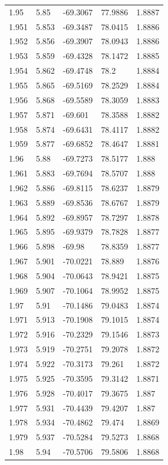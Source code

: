 \begin{tabular}{lllll}
1.95 & 5.85 & -69.3067 & 77.9886 & 1.8887 \\
1.951 & 5.853 & -69.3487 & 78.0415 & 1.8886 \\
1.952 & 5.856 & -69.3907 & 78.0943 & 1.8886 \\
1.953 & 5.859 & -69.4328 & 78.1472 & 1.8885 \\
1.954 & 5.862 & -69.4748 & 78.2 & 1.8884 \\
1.955 & 5.865 & -69.5169 & 78.2529 & 1.8884 \\
1.956 & 5.868 & -69.5589 & 78.3059 & 1.8883 \\
1.957 & 5.871 & -69.601 & 78.3588 & 1.8882 \\
1.958 & 5.874 & -69.6431 & 78.4117 & 1.8882 \\
1.959 & 5.877 & -69.6852 & 78.4647 & 1.8881 \\
1.96 & 5.88 & -69.7273 & 78.5177 & 1.888 \\
1.961 & 5.883 & -69.7694 & 78.5707 & 1.888 \\
1.962 & 5.886 & -69.8115 & 78.6237 & 1.8879 \\
1.963 & 5.889 & -69.8536 & 78.6767 & 1.8879 \\
1.964 & 5.892 & -69.8957 & 78.7297 & 1.8878 \\
1.965 & 5.895 & -69.9379 & 78.7828 & 1.8877 \\
1.966 & 5.898 & -69.98 & 78.8359 & 1.8877 \\
1.967 & 5.901 & -70.0221 & 78.889 & 1.8876 \\
1.968 & 5.904 & -70.0643 & 78.9421 & 1.8875 \\
1.969 & 5.907 & -70.1064 & 78.9952 & 1.8875 \\
1.97 & 5.91 & -70.1486 & 79.0483 & 1.8874 \\
1.971 & 5.913 & -70.1908 & 79.1015 & 1.8874 \\
1.972 & 5.916 & -70.2329 & 79.1546 & 1.8873 \\
1.973 & 5.919 & -70.2751 & 79.2078 & 1.8872 \\
1.974 & 5.922 & -70.3173 & 79.261 & 1.8872 \\
1.975 & 5.925 & -70.3595 & 79.3142 & 1.8871 \\
1.976 & 5.928 & -70.4017 & 79.3675 & 1.887 \\
1.977 & 5.931 & -70.4439 & 79.4207 & 1.887 \\
1.978 & 5.934 & -70.4862 & 79.474 & 1.8869 \\
1.979 & 5.937 & -70.5284 & 79.5273 & 1.8868 \\
1.98 & 5.94 & -70.5706 & 79.5806 & 1.8868 \\

\end{tabular}
